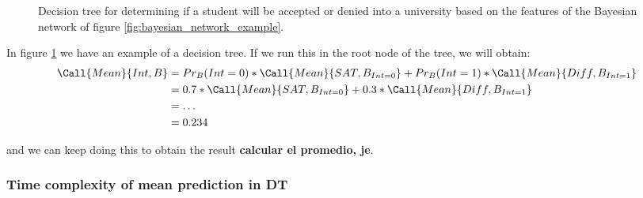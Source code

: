 \begin{figure}[ht]
    \centering
    
    \caption{Decision tree for determining if a student will be accepted or denied into a university based on the features of the Bayesian network of figure \ref{fig:bayesian_network_example}.}
    \label{fig:decision_tree_example}
\end{figure}

In figure \ref{fig:decision_tree_example} we have an example of a decision tree. If we run this in the root node of the tree, we will obtain: 
\begin{align*}
        \Call{Mean}{Int, B} &= Pr_B(Int = 0) * \Call{Mean}{SAT, B_{Int=0}} + Pr_B(Int = 1) * \Call{Mean}{Diff, B_{Int=1}}\\
        &= 0.7 * \Call{Mean}{SAT, B_{Int=0}} +0.3 * \Call{Mean}{Diff, B_{Int=1}} \\
        &= \dots \\
        &= 0.234
    \end{align*}

and we can keep doing this to obtain the result \textbf{calcular el promedio, je}. 

\subsubsection{Time complexity of mean prediction in DT}

